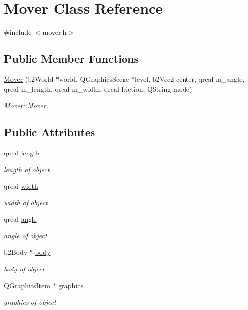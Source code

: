 \hypertarget{class_mover}{}\section{Mover Class Reference}
\label{class_mover}


{\ttfamily \#include $<$mover.\+h$>$}

\subsection*{Public Member Functions}
\begin{DoxyCompactItemize}
\item 
\hyperlink{class_mover_a8ec5e7ce87190ce9b25f1df64efa7821}{Mover} (b2\+World $\ast$world, Q\+Graphics\+Scene $\ast$level, b2\+Vec2 center, qreal m\+\_\+angle, qreal m\+\_\+length, qreal m\+\_\+width, qreal friction, Q\+String mode)
\begin{DoxyCompactList}\small\item\em \hyperlink{class_mover_a8ec5e7ce87190ce9b25f1df64efa7821}{Mover\+::\+Mover}. \end{DoxyCompactList}\end{DoxyCompactItemize}
\subsection*{Public Attributes}
\begin{DoxyCompactItemize}
\item 
qreal \hyperlink{class_mover_a2c55f3d5a807d328bcc8c73cdef5dda2}{length}
\begin{DoxyCompactList}\small\item\em length of object \end{DoxyCompactList}\item 
qreal \hyperlink{class_mover_ab78fbf587764d7cdcd417d2a444408d4}{width}
\begin{DoxyCompactList}\small\item\em width of object \end{DoxyCompactList}\item 
qreal \hyperlink{class_mover_acb7d779b2ce97a86149990dce48e88b5}{angle}
\begin{DoxyCompactList}\small\item\em angle of object \end{DoxyCompactList}\item 
b2\+Body $\ast$ \hyperlink{class_mover_a6e91384098180f0fef918dd45f97f201}{body}
\begin{DoxyCompactList}\small\item\em body of object \end{DoxyCompactList}\item 
Q\+Graphics\+Item $\ast$ \hyperlink{class_mover_a111eebc06a95c11dc6f48dcc6a33478f}{graphics}
\begin{DoxyCompactList}\small\item\em graphics of object \end{DoxyCompactList}\end{DoxyCompactItemize}


